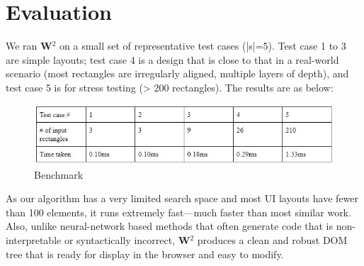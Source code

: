 \documentclass[runningheads]{llncs}
\newcommand{\W}{\textbf{W}$^2$ }
\begin{document}


\section{Evaluation}
We ran \W on a small set of representative test cases (|s|=5). Test case 1 to 3 are simple layouts; test case 4 is a design that is close to that in a real-world scenario (most rectangles are irregularly aligned, multiple layers of depth), and test case 5 is for stress testing (> 200 rectangles). The results are as below:
\begin{figure}[H]
  \vspace*{-0.1in}
  \includegraphics[width=1\textwidth]{src/benchmark.JPG}
  \caption{Benchmark}
\end{figure}
As our algorithm has a very limited search space and most UI layouts have fewer than 100 elements, it runs extremely fast—much faster than most similar work. Also, unlike neural-network based methods that often generate code that is non-interpretable or syntactically incorrect, \W produces a clean and robust DOM tree that is ready for display in the browser and easy to modify.
\end{document}
